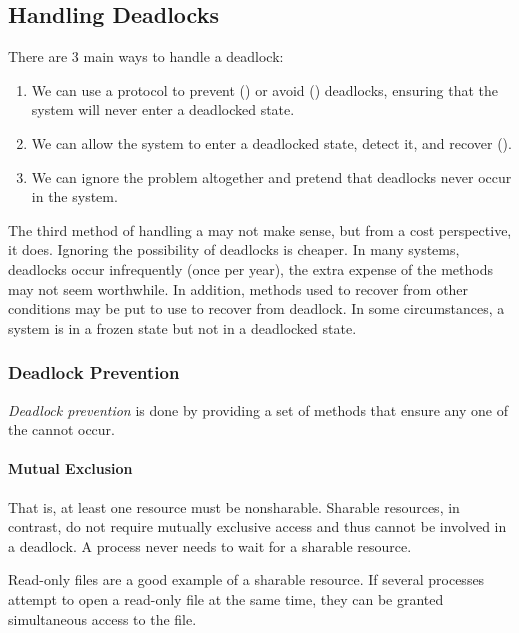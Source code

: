 \subsection{Handling Deadlocks}\label{subsec:Handling_Deadlocks}
There are 3 main ways to handle a deadlock:
\begin{enumerate}[noitemsep]
\item We can use a protocol to prevent () or avoid () deadlocks, ensuring that the system will never enter a deadlocked state.
\item We can allow the system to enter a deadlocked state, detect it, and recover ().
\item We can ignore the problem altogether and pretend that deadlocks never occur in the system.
\end{enumerate}

The third method of handling a  may not make sense, but from a cost perspective, it does.
Ignoring the possibility of deadlocks is cheaper.
In many systems, deadlocks occur infrequently (once per year), the extra expense of the methods may not seem worthwhile.
In addition, methods used to recover from other conditions may be put to use to recover from deadlock.
In some circumstances, a system is in a frozen state but not in a deadlocked state.

\subsubsection{Deadlock Prevention}\label{subsubsec:Deadlock_Prevention}
\begin{definition}\label{def:Deadlock_Prevention}
  \emph{Deadlock prevention} is done by providing a set of methods that ensure any one of the  cannot occur.
\end{definition}

\paragraph{Mutual Exclusion}\label{par:Deadlock_Prevention-Mutual_Exclusion}
That is, at least one resource must be nonsharable.
Sharable resources, in contrast, do not require mutually exclusive access and thus cannot be involved in a deadlock.
A process never needs to wait for a sharable resource.

Read-only files are a good example of a sharable resource.
If several processes attempt to open a read-only file at the same time, they can be granted simultaneous access to the file.

